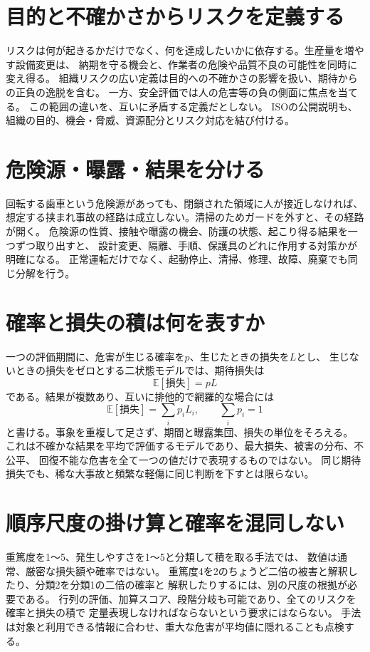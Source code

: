 \section{目的と不確かさからリスクを定義する}
\label{theory:safety:definition}
リスクは何が起きるかだけでなく、何を達成したいかに依存する。生産量を増やす設備変更は、
納期を守る機会と、作業者の危険や品質不良の可能性を同時に変え得る。
組織リスクの広い定義は目的への不確かさの影響を扱い、期待からの正負の逸脱を含む。
一方、安全評価では人の危害等の負の側面に焦点を当てる。
この範囲の違いを、互いに矛盾する定義だとしない。
ISOの公開説明も、組織の目的、機会・脅威、資源配分とリスク対応を結び付ける\cite{saf_iso31000}。

\section{危険源・曝露・結果を分ける}
回転する歯車という危険源があっても、閉鎖された領域に人が接近しなければ、
想定する挟まれ事故の経路は成立しない。清掃のためガードを外すと、その経路が開く。
危険源の性質、接触や曝露の機会、防護の状態、起こり得る結果を一つずつ取り出すと、
設計変更、隔離、手順、保護具のどれに作用する対策かが明確になる。
正常運転だけでなく、起動停止、清掃、修理、故障、廃棄でも同じ分解を行う。

\section{確率と損失の積は何を表すか}
\label{theory:safety:quantification}
一つの評価期間に、危害が生じる確率を\(p\)、生じたときの損失を\(L\)とし、
生じないときの損失をゼロとする二状態モデルでは、期待損失は
\[
 \mathbb E[\text{損失}]=pL
\]
である。結果が複数あり、互いに排他的で網羅的な場合には
\[
 \mathbb E[\text{損失}]=\sum_i p_iL_i,\qquad \sum_i p_i=1
\]
と書ける。事象を重複して足さず、期間と曝露集団、損失の単位をそろえる。
これは不確かな結果を平均で評価するモデルであり、最大損失、被害の分布、不公平、
回復不能な危害を全て一つの値だけで表現するものではない。
同じ期待損失でも、稀な大事故と頻繁な軽傷に同じ判断を下すとは限らない。

\section{順序尺度の掛け算と確率を混同しない}
重篤度を1〜5、発生しやすさを1〜5と分類して積を取る手法では、
数値は通常、厳密な損失額や確率ではない。
重篤度4を2のちょうど二倍の被害と解釈したり、分類2を分類1の二倍の確率と
解釈したりするには、別の尺度の根拠が必要である。
行列の評価、加算スコア、段階分岐も可能であり、全てのリスクを確率と損失の積で
定量表現しなければならないという要求にはならない\cite{saf_ra2006}。
手法は対象と利用できる情報に合わせ、重大な危害が平均値に隠れることも点検する。

